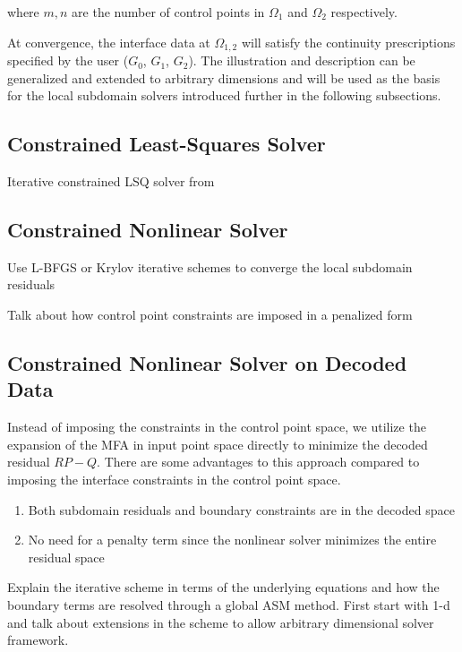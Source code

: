 \documentclass[conference]{IEEEtran}
\begin{document}
where $m, n$ are the number of control points in $\Omega_1$ and $\Omega_2$ respectively.

At convergence, the interface data at $\Omega_{1,2}$ will satisfy the continuity prescriptions specified by the user ($G_0$, $G_1$, $G_2$). The illustration and description can be generalized and extended to arbitrary dimensions and will be used as the basis for the local subdomain solvers introduced further in the following subsections.

\subsection{Constrained Least-Squares Solver}

Iterative constrained LSQ solver from \cite{nurbs-book}


\subsection{Constrained Nonlinear Solver}

Use L-BFGS or Krylov iterative schemes to converge the local subdomain residuals \cite{zhang-nurbs-continuity} \cite{zheng-bo-bspline-bfgs}

Talk about how control point constraints are imposed in a penalized form 

\subsection{Constrained Nonlinear Solver on Decoded Data}

Instead of imposing the constraints in the control point space, we utilize the expansion of the MFA in input point space directly to minimize the decoded residual $R P - Q$. There are some advantages to this approach compared to imposing the interface constraints in the control point space.

\begin{enumerate}
	\item Both subdomain residuals and boundary constraints are in the decoded space
	\item No need for a penalty term since the nonlinear solver minimizes the entire residual space
\end{enumerate}

Explain the iterative scheme in terms of the underlying equations and how the boundary terms are resolved through a global ASM method. First start with 1-d and talk about extensions in the scheme to allow arbitrary dimensional solver framework.
\end{document}
